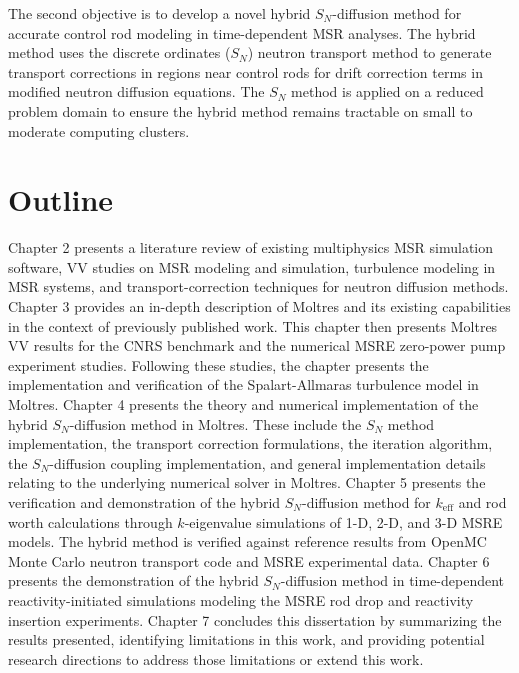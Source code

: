 
    The second objective is to
    develop a novel hybrid $S_N$-diffusion method for accurate control rod modeling in
    time-dependent \gls{MSR} analyses. The hybrid method uses the discrete ordinates ($S_N$)
    neutron transport method to generate transport corrections in regions near control rods for
    drift correction terms in modified neutron diffusion equations. The $S_N$ method is applied on
    a reduced problem domain to ensure the hybrid method remains tractable on small to moderate
    computing clusters.

\section{Outline}

Chapter 2 presents a literature review of existing multiphysics \gls{MSR} simulation software,
\gls{VV} studies on \gls{MSR} modeling and simulation, turbulence modeling in \gls{MSR} systems,
and transport-correction techniques for neutron diffusion methods.
Chapter 3 provides an in-depth description of Moltres and its existing capabilities in the context
of previously published work. This chapter then presents Moltres \gls{VV} results for the CNRS
benchmark and the numerical \gls{MSRE} zero-power pump experiment studies. Following these studies,
the chapter presents the implementation and verification of the Spalart-Allmaras turbulence model
in Moltres.
Chapter 4 presents the theory and numerical implementation of the hybrid
$S_N$-diffusion method in Moltres. These include the $S_N$ method implementation, the transport
correction formulations, the iteration algorithm, the $S_N$-diffusion coupling implementation, and
general implementation details relating to the underlying numerical solver in Moltres.
Chapter 5 presents the verification and demonstration of the hybrid $S_N$-diffusion method for
$k_\text{eff}$ and rod worth calculations through
$k$-eigenvalue simulations of 1-D, 2-D, and 3-D \gls{MSRE} models. The hybrid method is verified
against reference results from OpenMC Monte Carlo neutron transport code and \gls{MSRE}
experimental data.
Chapter 6 presents the demonstration of the hybrid $S_N$-diffusion method in time-dependent
reactivity-initiated simulations modeling the \gls{MSRE} rod drop and reactivity insertion
experiments.
Chapter 7 concludes this dissertation by summarizing the results presented, identifying limitations
in this work, and providing potential research directions to address those limitations or extend
this work.
